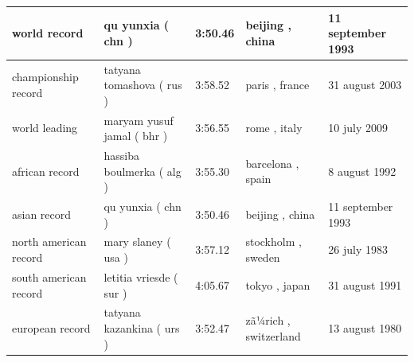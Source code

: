 \documentclass{article}
\begin{document}
\begin{tabular}{lllll}
\toprule
world record & qu yunxia ( chn ) & 3:50.46 & beijing , china & 11 september 1993 \\
\midrule
championship record & tatyana tomashova ( rus ) & 3:58.52 & paris , france & 31 august 2003 \\
world leading & maryam yusuf jamal ( bhr ) & 3:56.55 & rome , italy & 10 july 2009 \\
african record & hassiba boulmerka ( alg ) & 3:55.30 & barcelona , spain & 8 august 1992 \\
asian record & qu yunxia ( chn ) & 3:50.46 & beijing , china & 11 september 1993 \\
north american record & mary slaney ( usa ) & 3:57.12 & stockholm , sweden & 26 july 1983 \\
south american record & letitia vriesde ( sur ) & 4:05.67 & tokyo , japan & 31 august 1991 \\
european record & tatyana kazankina ( urs ) & 3:52.47 & zã¼rich , switzerland & 13 august 1980 \\
\bottomrule
\end{tabular}
\end{document}
